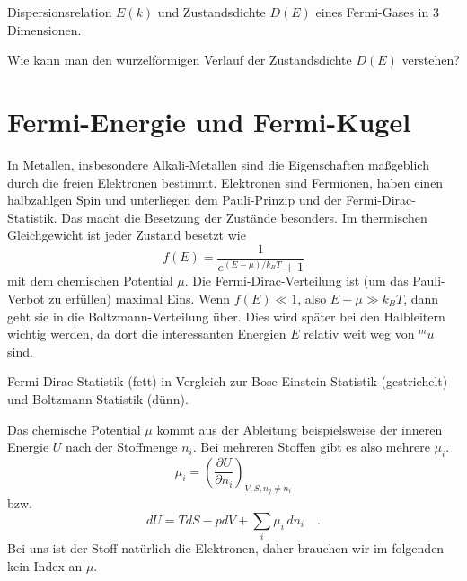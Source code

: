 \begin{marginfigure}
    \caption{Dispersionsrelation $E(k)$ und Zustandsdichte $D(E)$ eines Fermi-Gases in 3 Dimensionen.}
\end{marginfigure}


\begin{questions} 
    \item Wie kann man den wurzelförmigen Verlauf der Zustandsdichte $D(E)$ verstehen?
\end{questions}


\section*{Fermi-Energie und Fermi-Kugel}

In Metallen, insbesondere Alkali-Metallen sind die Eigenschaften maßgeblich durch die freien Elektronen bestimmt.
Elektronen sind Fermionen, haben einen halbzahlgen Spin und unterliegen  dem Pauli-Prinzip und der Fermi-Dirac-Statistik. Das macht die Besetzung der Zustände besonders. Im thermischen Gleichgewicht ist  jeder Zustand besetzt wie 
\begin{equation}
    f(E) = \frac{1}{e^{(E-\mu)/k_B T} + 1}
\end{equation}
mit dem chemischen Potential $\mu$. Die Fermi-Dirac-Verteilung ist (um das Pauli-Verbot zu erfüllen) maximal Eins. Wenn $f(E) \ll 1$, also $E- \mu \gg k_B T$, dann geht sie in die Boltzmann-Verteilung über. Dies wird später bei den Halbleitern wichtig werden, da dort die interessanten Energien $E$ relativ weit weg von $^mu$ sind.

\begin{marginfigure}
    \caption{Fermi-Dirac-Statistik (fett) in Vergleich zur Bose-Einstein-Statistik (gestrichelt) und Boltzmann-Statistik (dünn).}
\end{marginfigure}

Das chemische Potential $\mu$ kommt aus der Ableitung beispielsweise der inneren Energie $U$ nach der Stoffmenge $n_i$. Bei mehreren Stoffen gibt es also mehrere $\mu_i$.
\begin{equation}
    \mu_i = \left( \frac{\partial U}{\partial n_i} \right)_{V,S,n_j \neq n_i}
\end{equation}
bzw.
\begin{equation}
    dU = T dS - p dV + \sum_i \mu_i \, d n_i \quad .
\end{equation}
Bei uns ist der Stoff natürlich die Elektronen, daher brauchen wir im folgenden kein Index an $\mu$.

